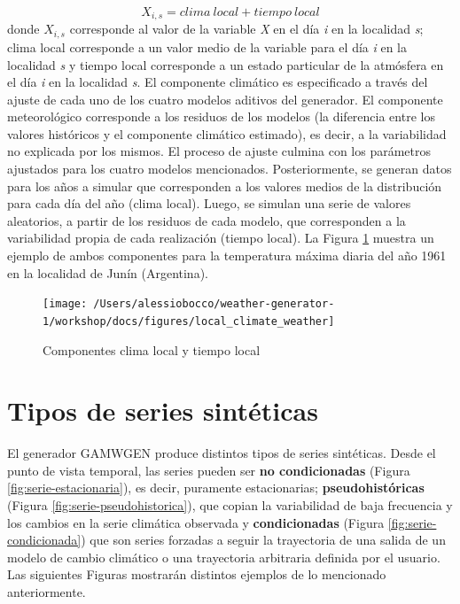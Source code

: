\documentclass[
  12pt]{article}
\begin{document}
\[
X_{i,s} = clima\ local  + tiempo\ local
\]
donde \(X_{i,s}\) corresponde al valor de la variable \emph{X} en el día \emph{i} en la localidad \emph{s}; clima local corresponde a un valor medio de la variable para el día \emph{i} en la localidad \emph{s} y tiempo local corresponde a un estado particular de la atmósfera en el día \emph{i} en la localidad \emph{s}. El componente climático es especificado a través del ajuste de cada uno de los cuatro modelos aditivos del generador. El componente meteorológico corresponde a los residuos de los modelos (la diferencia entre los valores históricos y el componente climático estimado), es decir, a la variabilidad no explicada por los mismos.
El proceso de ajuste culmina con los parámetros ajustados para los cuatro modelos mencionados. Posteriormente, se generan datos para los años a simular que corresponden a los valores medios de la distribución para cada día del año (clima local). Luego, se simulan una serie de valores aleatorios, a partir de los residuos de cada modelo, que corresponden a la variabilidad propia de cada realización (tiempo local). La Figura \ref{fig:tiempo-clima} muestra un ejemplo de ambos componentes para la temperatura máxima diaria del año 1961 en la localidad de Junín (Argentina).

\begin{figure}[H]

{\centering \texttt{[image: /Users/alessiobocco/weather-generator-1/workshop/docs/figures/local\_climate\_weather]} 

}

\caption{Componentes clima local y tiempo local}\label{fig:tiempo-clima}
\end{figure}

\hypertarget{tipos-de-series-sintuxe9ticas}{%
\section{Tipos de series sintéticas}\label{tipos-de-series-sintuxe9ticas}}

El generador GAMWGEN produce distintos tipos de series sintéticas. Desde el punto de vista temporal, las series pueden ser \textbf{no condicionadas} (Figura \ref{fig:serie-estacionaria}), es decir, puramente estacionarias; \textbf{pseudohistóricas} (Figura \ref{fig:serie-pseudohistorica}), que copian la variabilidad de baja frecuencia y los cambios en la serie climática observada y \textbf{condicionadas} (Figura \ref{fig:serie-condicionada}) que son series forzadas a seguir la trayectoria de una salida de un modelo de cambio climático o una trayectoria arbitraria definida por el usuario. Las siguientes Figuras mostrarán distintos ejemplos de lo mencionado anteriormente.
\end{document}
